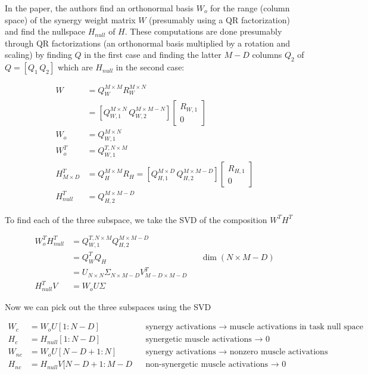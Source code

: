 In the paper, the authors find an orthonormal basis \(W_o\) for the
range (column space) of the synergy weight matrix \(W\) (presumably
using a QR factorization) and find the nullspace \(H_{null}\) of \(H\).
These computations are done presumably through QR factorizations (an
orthonormal basis multiplied by a rotation and scaling) by finding \(Q\)
in the first case and finding the latter \(M-D\) columns \(Q_2\) of
\(Q = [Q_1 \, Q_2]\) which are \(H_{null}\) in the second case:

\begin{align*}
    W &= Q_W^{M\times M}R_W^{M\times N} \\
      &= \left[Q_{W,1}^{M\times N}\,Q_{W,2}^{M\times M-N}\right]\begin{bmatrix}R_{W,1} \\ 0 \end{bmatrix} \\
    W_o &= Q_{W,1}^{M\times N} \\
    W_o^T &= Q_{W,1}^{T, N\times M} \\
    H^T_{M\times D} &= Q_H^{M\times M}R_H = \left[Q_{H,1}^{M\times D}\,Q_{H,2}^{M\times M-D}\right]\begin{bmatrix}R_{H,1} \\ 0 \end{bmatrix} \\
    H^T_{null} &= Q_{H,2}^{M\times M-D}
\end{align*}

To find each of the three subspace, we take the SVD of the composition
\(W^TH^T\)

\begin{align*}
    W_o^TH^T_{null} &= Q_{W,1}^{T, N\times M} Q_{H,2}^{M\times M-D} \\
    &= Q^T_WQ_H && \dim(N \times M-D) \\
    &= U_{N\times N}\Sigma_{N \times M-D} V^T_{M-D\times M-D} \\
    H^T_{null}V &= W_oU\Sigma
\end{align*}

Now we can pick out the three subspaces using the SVD

\begin{align*}
    W_c &= W_oU[1:N-D] && \text{synergy activations $\rightarrow$ muscle activations in task null space}\\
    H_c &= H_{null}[1:N-D] && \text{synergetic muscle activations $\rightarrow$ 0} \\
    W_{nc} &= W_oU[N-D+1:N] && \text{synergy activations $\rightarrow$ nonzero muscle activations}\\
    H_{nc} &= H_{null}V[N-D+1:M-D && \text{non-synergetic muscle activations $\rightarrow$ 0} \\
\end{align*}

